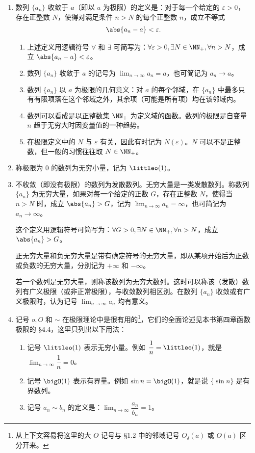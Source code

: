 \begin{enumerate}[label=\arabic*.]
  \item 数列 $\{a_n\}$ 收敛于 $a$（即以 $a$ 为极限）的定义是：对于每一个给定的 $\varepsilon>0$，存在正整数 $N$，使得对满足条件 $n>N$ 的每个正整数 $n$，成立不等式
  \[
    \abs{a_n-a}<\varepsilon.
  \]
  \begin{enumerate}[label=(\arabic*)]
    \item 上述定义用逻辑符号 $\forall$ 和 $\exists$ 可简写为：$\forall\varepsilon>0,\exists N\in\NN_+,\forall n>N$，成立 $\abs{a_n-a}<\varepsilon$。
    \item 数列 $\{a_n\}$ 收敛于 $a$ 的记号为 $\displaystyle\lim_{n\to\infty}a_n=a$，也可简记为 $a_n\to a$。
    \item 数列 $\{a_n\}$ 以 $a$ 为极限的几何意义：对 $a$ 的每个邻域，在 $\{a_n\}$ 中最多只有有限项落在这个邻域之外，其余项（可能是所有项）均在该邻域内。
    \item 数列可以看成是以正整数集 $\NN_+$ 为定义域的函数。数列的极限是自变量 $n$ 趋于无穷大时因变量值的一种趋势。
    \item 在极限定义中的 $N$ 与 $\varepsilon$ 有关，因此有时记为 $N(\varepsilon)$。$N$ 可以不是正整数，但一般的习惯往往取 $N\in\NN_+$。
  \end{enumerate}

  \item 称极限为 $0$ 的数列为无穷小量，记为 $\littleo(1)$。

  \item 不收敛（即没有极限）的数列为发散数列。无穷大量是一类发散数列。称数列 $\{a_n\}$ 为无穷大量，如果对每一个给定的正数 $G$，存在正整数 $N$，使得当 $n>N$ 时，成立 $\abs{a_n}>G$，记为 $\displaystyle\lim_{n\to\infty}a_n=\infty$，也可简记为 $a_n\to\infty$。

  这个定义用逻辑符号可简写为：$\forall G>0,\exists N\in\NN_+,\forall n>N$，成立 $\abs{a_n}>G$。

  正无穷大量和负无穷大量是带有确定符号的无穷大量，即从某项开始后为正数或负数的无穷大量，分别记为 $+\infty$ 和 $-\infty$。

  若一个数列是无穷大量，则称该数列为无穷大数列。这时可以称该（发散）数列有广义极限（或非正常极限），与收敛数列相区别。在数列 $\{a_n\}$ 收敛或有广义极限时，认为记号 $\displaystyle\lim_{n\to\infty}a_n$ 均有意义。

  \item 记号 $o,O$ 和 $\sim$ 在极限理论中是很有用的\footnote{从上下文容易将这里的大 $O$ 记号与 §1.2 中的邻域记号 $O_\delta(a)$ 或 $O(a)$ 区分开来。}，它们的全面论述见本书第四章函数极限的 §4.4，这里只列出以下用法：
  \begin{enumerate}[label=(\arabic*)]
    \item 记号 $\littleo(1)$ 表示无穷小量。例如 $\dfrac1n=\littleo(1)$，就是 $\displaystyle\lim_{n\to\infty}\dfrac1n=0$。
    \item 记号 $\bigO(1)$ 表示有界量。例如 $\sin n=\bigO(1)$，就是说 $\{\sin n\}$ 是有界数列。
    \item 记号 $a_n\sim b_n$ 的定义是：$\displaystyle\lim_{n\to\infty}\dfrac{a_n}{b_n}=1$。
  \end{enumerate}


\end{enumerate}
